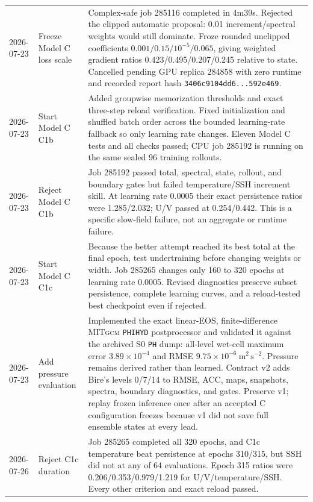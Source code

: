 \documentclass[11pt]{article}
\newcommand{\MITgcm}{\textsc{MITgcm}}
\begin{document}
\begin{longtable}{@{}p{}p{}p{}@{}}
2026-07-23 & Freeze Model C loss scale & Complex-safe job 285116 completed in 4m39s.  Rejected the clipped automatic proposal: 0.01 increment/spectral weights would still dominate.  Froze rounded unclipped coefficients \(0.001/0.15/10^{-5}/0.065\), giving weighted gradient ratios 0.423/0.495/0.207/0.245 relative to state.  Cancelled pending GPU replica 284858 with zero runtime and recorded report hash \texttt{3406c9104dd6...592e469}. \\
2026-07-23 & Start Model C C1b & Added groupwise memorization thresholds and exact three-step reload verification.  Fixed initialization and shuffled batch order across the bounded learning-rate fallback so only learning rate changes.  Eleven Model C tests and all checks passed; CPU job 285192 is running on the same sealed 96 training rollouts. \\
2026-07-23 & Reject Model C C1b & Job 285192 passed total, spectral, state, rollout, and boundary gates but failed temperature/SSH increment skill.  At learning rate 0.0005 their exact persistence ratios were 1.285/2.032; U/V passed at 0.254/0.442.  This is a specific slow-field failure, not an aggregate or runtime failure. \\
2026-07-23 & Start Model C C1c & Because the better attempt reached its best total at the final epoch, test undertraining before changing weights or width.  Job 285265 changes only 160 to 320 epochs at learning rate 0.0005.  Revised diagnostics preserve subset persistence, complete learning curves, and a reload-tested best checkpoint even if rejected. \\
2026-07-23 & Add pressure evaluation & Implemented the exact linear-EOS, finite-difference \MITgcm{} \texttt{PHIHYD} postprocessor and validated it against the archived S0 \texttt{PH} dump: all-level wet-cell maximum error \(3.89\times10^{-4}\) and RMSE \(9.75\times10^{-6}\ \mathrm{m^2\,s^{-2}}\).  Pressure remains derived rather than learned.  Contract v2 adds Bire's levels 0/7/14 to RMSE, ACC, maps, snapshots, spectra, boundary diagnostics, and gates.  Preserve v1; replay frozen inference once after an accepted C configuration freezes because v1 did not save full ensemble states at every lead. \\
2026-07-26 & Reject C1c duration & Job 285265 completed all 320 epochs, and C1c temperature beat persistence at epochs 310/315, but SSH did not at any of 64 evaluations.  Epoch 315 ratios were 0.206/0.353/0.979/1.219 for U/V/temperature/SSH.  Every other criterion and exact reload passed. \\

\end{longtable}
\end{document}
